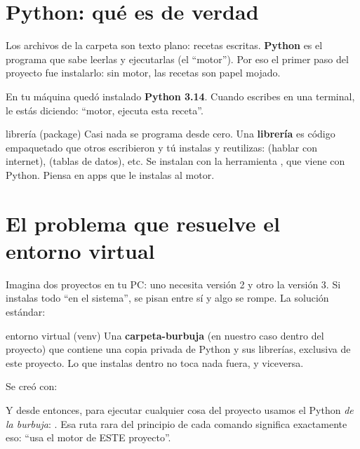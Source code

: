 \documentclass[11pt,a4paper]{article}
\begin{document}

\section{Python: qué es de verdad}

Los archivos  de la carpeta  son texto plano: recetas escritas.
\textbf{Python} es el programa que sabe leerlas y ejecutarlas (el ``motor''). Por eso el
primer paso del proyecto fue instalarlo: sin motor, las recetas son papel mojado.

En tu máquina quedó instalado \textbf{Python 3.14}. Cuando escribes
 en una terminal, le estás diciendo: ``motor, ejecuta esta receta''.

\begin{concepto}{librería (package)}
Casi nada se programa desde cero. Una \textbf{librería} es código empaquetado que otros
escribieron y tú instalas y reutilizas:  (hablar con internet),
 (tablas de datos), etc. Se instalan con la herramienta ,
que viene con Python. Piensa en apps que le instalas al motor.
\end{concepto}

\section{El problema que resuelve el entorno virtual}

Imagina dos proyectos en tu PC: uno necesita  versión 2 y otro la versión 3.
Si instalas todo ``en el sistema'', se pisan entre sí y algo se rompe. La solución estándar:

\begin{concepto}{entorno virtual (venv)}
Una \textbf{carpeta-burbuja} (en nuestro caso  dentro del proyecto) que
contiene una copia privada de Python y sus librerías, exclusiva de este proyecto.
Lo que instalas dentro no toca nada fuera, y viceversa.

Se creó con: 

Y desde entonces, para ejecutar cualquier cosa del proyecto usamos el Python \emph{de la
burbuja}: . Esa ruta rara del
principio de cada comando significa exactamente eso: ``usa el motor de ESTE proyecto''.
\end{concepto}
\end{document}

